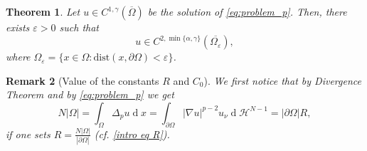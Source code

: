 \documentclass[10pt,a4paper]{amsart}
\numberwithin{equation}{section}
\newtheorem{teo}{Theorem}[section]
\newtheorem{rem}[teo]{Remark}
\renewcommand{\d}[1]{\ensuremath{\operatorname{d}\!{#1}}}
\begin{document}
\begin{teo}\label{thm regularity C2}
Let $u\in C^{1,\gamma}(\overline{\Omega})$ be the solution of \eqref{eq:problem_p}. Then, there exists $\varepsilon>0$ such that
\[
    u\in C^{2,\min\{\alpha,\gamma \}}(\overline{\Omega_\varepsilon}), 
\]
where $\Omega_\varepsilon=\{x\in\Omega: \mathrm{dist}(x,\partial\Omega)<\varepsilon\}$.
\end{teo}



\begin{rem}[Value of the constants $R$ and $C_0$]
    We first notice that by Divergence Theorem and by \eqref{eq:problem_p} we get
    \begin{equation*}
        N|\Omega| = \int_\Omega \Delta_p u \d{x} = \int_{\partial\Omega} |\nabla u|^{p-2} u_\nu \d{}\mathcal{H}^{N-1} = |\partial\Omega|R,
    \end{equation*}
    if one sets $R=\frac{N|\Omega|}{|\partial\Omega|}$ (cf. \eqref{intro eq R}).


\end{rem}
\end{document}
